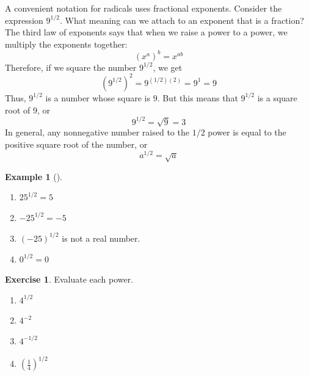 \documentclass[10pt,]{book}
\theoremstyle{plain}
\theoremstyle{definition}
\theoremstyle{definition}
\theoremstyle{definition}
\newtheorem{example}[theorem]{Example}
\theoremstyle{definition}
\theoremstyle{definition}
\newtheorem{exercise}[theorem]{Exercise}
\numberwithin{equation}{section}
\begin{document}
    A convenient notation for radicals uses fractional exponents. Consider the expression \(9^{1/2}\). What meaning can we attach to an exponent that is a fraction? The third law of exponents says that when we raise a power to a power, we multiply the exponents together:
    \begin{equation*}\left(x^a\right)^b = x^{ab}\end{equation*}
    Therefore, if we square the number \(9^{1/2}\), we get
    \begin{equation*}\left(9^{1/2}\right)^2 = 9^{(1/2)(2)} = 9^1 = 9\end{equation*}
    Thus, \(9^{1/2}\) is a number whose square is \(9\). But this means that \(9^{1/2}\) is a square root of \(9\), or
    \begin{equation*}9^{1/2} =\sqrt{9} = 3\end{equation*}
    In general, any nonnegative number raised to the \(1/2\) power is equal to the positive square root of the number, or
    \begin{equation*}a^{1/2} =\sqrt{a}\end{equation*}
%
\begin{example}[]\label{example-exponential-notation}
\leavevmode%
\begin{enumerate}[label=*\alph**]
\item\hypertarget{li-467}{}\(25^{1/2} = 5\)\item\hypertarget{li-468}{}\(−25^{1/2} = −5\)\item\hypertarget{li-469}{}\((−25)^{1/2}\) is not a real number.\item\hypertarget{li-470}{}\(0^{1/2} = 0\)\end{enumerate}
\end{example}
\begin{exercise}\label{exercise-exponential-notation}
Evaluate each power.
    \leavevmode%
\begin{enumerate}[label=*\alph**]
\item\hypertarget{li-471}{}\(4^{1/2}\)\item\hypertarget{li-472}{}\(4^{−2}\)\item\hypertarget{li-473}{}\(4^{−1/2}\)\item\hypertarget{li-474}{}\(\left(\frac{1}{4}\right)^{1/2}\)\end{enumerate}
%
\end{exercise}
\par
\end{document}
